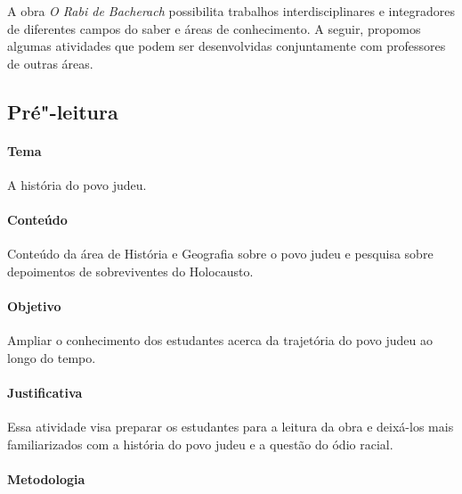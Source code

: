 \documentclass[12pt]{extarticle}
\begin{document}
A obra \emph{O Rabi de Bacherach} possibilita trabalhos
interdisciplinares e integradores de diferentes campos do saber e áreas
de conhecimento. A seguir, propomos algumas atividades que podem ser
desenvolvidas conjuntamente com professores de outras áreas. 

\begin{comment}Além das
habilidades de Linguagens e suas Tecnologias e de Língua Portuguesa,
indicadas nas etapas da seção anterior e válidas também para esta,
listamos a seguir as habilidades de outras áreas, presentes na abordagem
interdisciplinar:
\end{comment}

\subsection{Pré"-leitura}

\paragraph{Tema} A história do povo judeu.

\paragraph{Conteúdo} Conteúdo da área de História e Geografia sobre o povo judeu
e pesquisa sobre depoimentos de sobreviventes do Holocausto.

\paragraph{Objetivo} Ampliar o conhecimento dos estudantes acerca da trajetória
do povo judeu ao longo do tempo.

\paragraph{Justificativa} Essa atividade visa preparar os estudantes para
a leitura da obra e deixá-los mais familiarizados com a história do povo 
judeu e a questão do ódio racial.

\paragraph{Metodologia}
\end{document}
